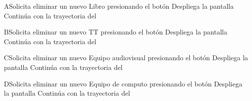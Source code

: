 
\begin{UCtrayectoriaA}{A}{Solicita eliminar un nuevo Libro presionando el botón }	
		\UCpaso[\UCsist] Despliega la pantalla  
		\UCpaso[\UCsist] Continúa con la trayectoria del 
		\end{UCtrayectoriaA}

\begin{UCtrayectoriaA}{B}{Solicita eliminar un nuevo TT presionando el botón }	
		\UCpaso[\UCsist] Despliega la pantalla  
		\UCpaso[\UCsist] Continúa con la trayectoria del 
\end{UCtrayectoriaA}


\begin{UCtrayectoriaA}{C}{Solicita eliminar un nuevo Equipo audiovisual presionando el botón }	
		\UCpaso[\UCsist] Despliega la pantalla  
		\UCpaso[\UCsist] Continúa con la trayectoria del 
\end{UCtrayectoriaA}


\begin{UCtrayectoriaA}{D}{Solicita eliminar un nuevo Equipo de computo presionando el botón }	
		\UCpaso[\UCsist] Despliega la pantalla  
		\UCpaso[\UCsist] Continúa con la trayectoria del 
\end{UCtrayectoriaA}

